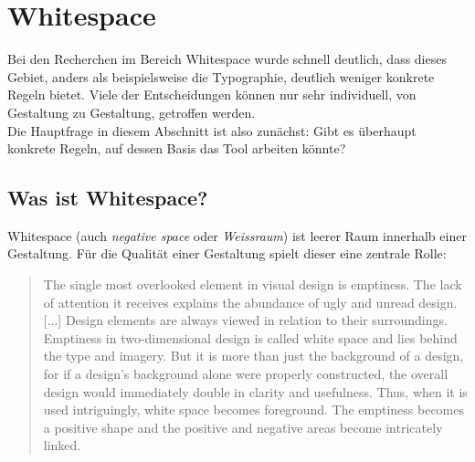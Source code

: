 
\chapter{Whitespace} %

\label{Whitespace} %



Bei den Recherchen im Bereich Whitespace wurde schnell deutlich, dass dieses Gebiet, anders als beispielsweise die Typographie, deutlich weniger konkrete Regeln bietet. Viele der Entscheidungen können nur sehr individuell, von Gestaltung zu Gestaltung, getroffen werden. \\
Die Hauptfrage in diesem Abschnitt ist also zunächst: Gibt es überhaupt konkrete Regeln, auf dessen Basis das Tool arbeiten könnte?


\section{Was ist Whitespace?}

Whitespace (auch \textit{negative space} oder \textit{Weissraum}) ist leerer Raum innerhalb einer Gestaltung. Für die Qualität einer Gestaltung spielt dieser eine zentrale Rolle:

\begin{quote}
The single most overlooked element in visual design is emptiness. The lack of attention it receives explains the abundance of ugly and unread design. [...]
Design elements are always viewed in relation to their surroundings. Emptiness in two-dimensional design is called white space and lies behind the type and imagery. But it is more than just the background of a design, for if a design's background alone were properly constructed, the overall design would immediately double in clarity and usefulness. Thus, when it is used intriguingly, white space becomes foreground. The emptiness becomes a positive shape and the positive and negative areas become intricately linked. \cite[S.19]{white2011elements}
\end{quote}

